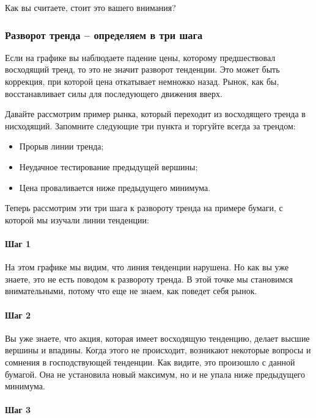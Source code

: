 \documentclass{book}
\begin{document}
Как вы считаете, стоит это вашего внимания?

\subsubsection{Разворот тренда – определяем в три шага}

Если на графике вы наблюдаете падение цены, которому предшествовал восходящий тренд, то это не значит разворот тенденции. Это может быть коррекция, при которой цена откатывает немножко назад. Рынок, как бы, восстанавливает силы для последующего движения вверх.

Давайте рассмотрим пример рынка, который переходит из восходящего тренда в нисходящий. Запомните следующие три пункта и торгуйте всегда за трендом:
\begin{itemize}
\item     Прорыв линии тренда;
\item     Неудачное тестирование предыдущей вершины;
\item     Цена проваливается ниже предыдущего минимума.
\end{itemize}

Теперь рассмотрим эти три шага к развороту тренда  на примере бумаги,
с которой мы изучали линии тенденции:

\paragraph{Шаг 1}

На этом графике мы видим, что линия тенденции нарушена. Но как вы уже
знаете, это не есть поводом к  развороту тренда. В этой точке мы
становимся внимательными, потому что еще не знаем, как поведет себя
рынок.

\paragraph{Шаг 2}

Вы уже знаете, что акция, которая имеет восходящую тенденцию, делает
высшие вершины и впадины. Когда этого не происходит, возникают
некоторые вопросы и сомнения в господствующей тенденции. Как видите,
это произошло с данной бумагой. Она не установила новый максимум, но и
не упала ниже предыдущего минимума.

\paragraph{Шаг 3}
\end{document}
